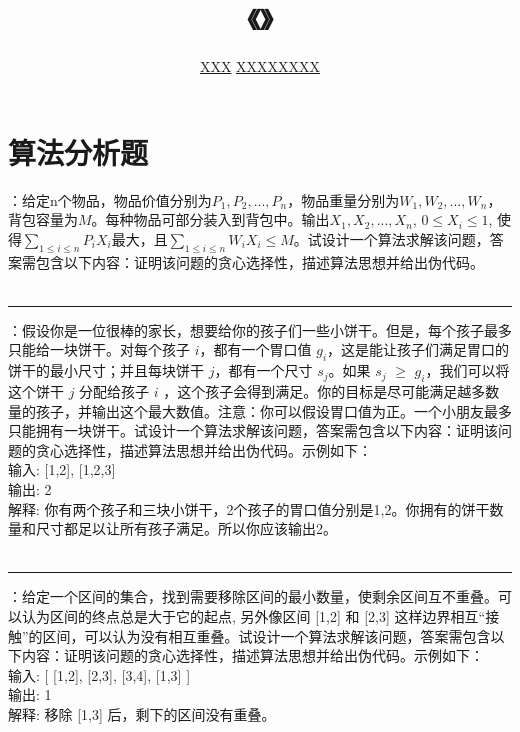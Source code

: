 \documentclass[UTF8,16pt]{article} %
\title{《\heiti{算法设计与分析}》\heiti{第{\color{red}4}次作业}}
\author{\kaishu{姓名：}\underline{XXX} \quad\quad\quad\quad\quad  \kaishu{学号：}\underline{XXXXXXXX}}
\date{}
\begin{document}
	
\maketitle
\vbox{} %

\section*{\textbf{算法分析题}}
：给定n个物品，物品价值分别为$P_{1},P_{2},...,P_{n}$，物品重量分别为$W_{1},W_{2},...,W_{n}$，背包容量为$M$。每种物品可部分装入到背包中。输出$X_{1},X_{2},...,X_{n}$, $0\le X_{i}\le 1$, 使得$\sum_{1\le i \le n}P_{i}X_{i}$最大，且$\sum_{1\le i\le n}W_{i}X_{i}\le M$。试设计一个算法求解该问题，答案需包含以下内容：证明该问题的贪心选择性，描述算法思想并给出伪代码。\\
{}\\
\rule[0pt]{14.3cm}{0.05em}

\vbox{} %
：假设你是一位很棒的家长，想要给你的孩子们一些小饼干。但是，每个孩子最多只能给一块饼干。对每个孩子 $i$，都有一个胃口值 $g_{i}$，这是能让孩子们满足胃口的饼干的最小尺寸；并且每块饼干 $j$，都有一个尺寸 $s_{j}$。如果 $s_{j}$ $\ge$ $g_{i}$，我们可以将这个饼干 $j$ 分配给孩子 $i$ ，这个孩子会得到满足。你的目标是尽可能满足越多数量的孩子，并输出这个最大数值。注意：你可以假设胃口值为正。一个小朋友最多只能拥有一块饼干。试设计一个算法求解该问题，答案需包含以下内容：证明该问题的贪心选择性，描述算法思想并给出伪代码。示例如下：\\
输入: [1,2], [1,2,3]\\
输出: 2\\
解释: 你有两个孩子和三块小饼干，2个孩子的胃口值分别是1,2。你拥有的饼干数量和尺寸都足以让所有孩子满足。所以你应该输出2。\\
{}\\
\rule[0pt]{14.3cm}{0.05em}

\vbox{} %
：给定一个区间的集合，找到需要移除区间的最小数量，使剩余区间互不重叠。可以认为区间的终点总是大于它的起点, 另外像区间 [1,2] 和 [2,3] 这样边界相互“接触”的区间，可以认为没有相互重叠。试设计一个算法求解该问题，答案需包含以下内容：证明该问题的贪心选择性，描述算法思想并给出伪代码。示例如下：\\
输入: [ [1,2], [2,3], [3,4], [1,3] ]\\
输出: 1\\
解释: 移除 [1,3] 后，剩下的区间没有重叠。\\
{}\\
\vbox{} %
\end{document}

